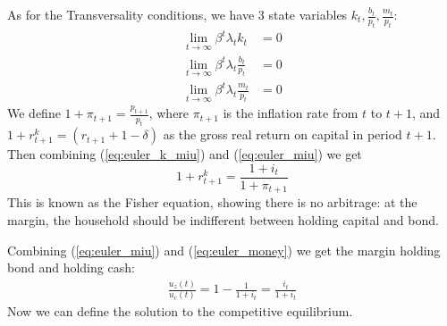 \documentclass[12pt]{article}
\begin{document}
As for the Transversality conditions, we have 3 state variables $k_t, \frac{b_t}{p_t}, \frac{m_t}{p_t}$:
\begin{align}
	\lim_{t\rightarrow \infty} \beta^t \lambda_t k_t &= 0 \nonumber\\
	\lim_{t\rightarrow \infty} \beta^t \lambda_t \frac{b_t}{p_t} &= 0 \label{eq:trans_miu}\\
	\lim_{t\rightarrow \infty} \beta^t \lambda_t \frac{m_t}{p_t} &= 0 \nonumber
\end{align}
We define $1+\pi_{t+1} = \frac{p_{t+1}}{p_t}$, where $\pi_{t+1}$ is the inflation rate from $t$ to $t+1$, and $1+r_{t+1}^k = (r_{t+1} + 1 - \delta)$ as the gross real return on capital in period $t+1$. Then combining (\ref{eq:euler_k_miu}) and (\ref{eq:euler_miu}) we get
\begin{equation}
	1+r^k_{t+1} = \frac{1+i_t}{1+\pi_{t+1}}
\end{equation}
This is known as the Fisher equation, showing there is no arbitrage: at the margin, the household should be indifferent between holding capital and bond.

Combining (\ref{eq:euler_miu}) and (\ref{eq:euler_money}) we get the margin holding bond and holding cash:
\begin{align} \label{eq:miu_cash}
	\frac{u_z(t)}{u_c(t)} = 1-\frac{1}{1+i_t} = \frac{i_t}{1+ i_t}
\end{align}
Now we can define the solution to the competitive equilibrium.
\end{document}
